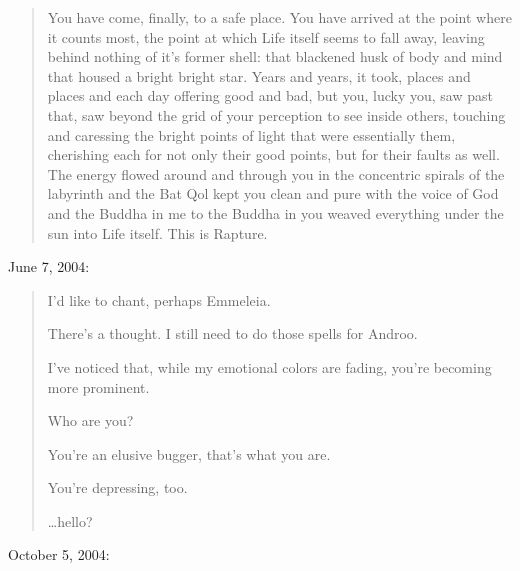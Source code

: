 \begin{quotation}
\noindent You have come, finally, to a safe place. You have arrived at the point where it counts most, the point at which Life itself seems to fall away, leaving behind nothing of it's former shell: that blackened husk of body and mind that housed a bright bright star. Years and years, it took, places and places and each day offering good and bad, but you, lucky you, saw past that, saw beyond the grid of your perception to see inside others, touching and caressing the bright points of light that were essentially them, cherishing each for not only their good points, but for their faults as well. The energy flowed around and through you in the concentric spirals of the labyrinth and the Bat Qol kept you clean and pure with the voice of God and the Buddha in me to the Buddha in you weaved everything under the sun into Life itself. This is Rapture.
\end{quotation}
\newpage

\noindent June 7, 2004:

\begin{quotation}
\noindent I'd like to chant, perhaps Emmeleia.


\noindent There's a thought. I still need to do those spells for Androo.


\noindent I've noticed that, while my emotional colors are fading, you're becoming more prominent.

Who are you?


\noindent You're an elusive bugger, that's what you are.


\noindent You're depressing, too.

\vspace{2\onelineskip}

\noindent\ldots{}hello?
\end{quotation}
\newpage

\noindent October 5, 2004:

